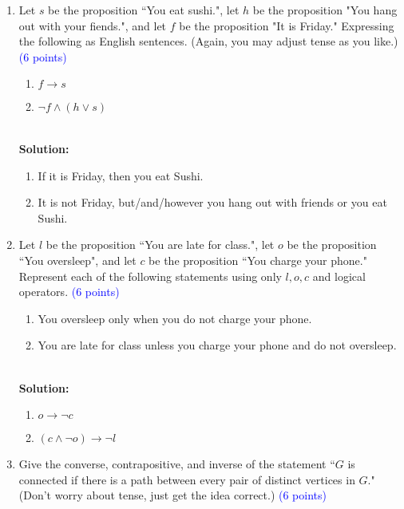 \documentclass{article}
\newcommand{\pt}[1]{\textcolor{blue}{(#1 points)}}
\newenvironment{solution}
{
\par
\color{blue}
\vspace{2mm}
\hline \\
\textbf{Solution:}
}
{
\vspace{2mm}
\newpage
}
\begin{document}
\begin{enumerate}
    \item Let $s$ be the proposition ``You eat sushi.", let $h$ be the proposition "You hang out with your fiends.", and let $f$ be the proposition "It is Friday." Expressing the following as English sentences. (Again, you may adjust tense as you like.) \pt 6
    \begin{enumerate}
        \item $f \rightarrow s$
        \item $\lnot f \wedge (h \lor s)$
    \end{enumerate}
    
    \begin{solution}
    \begin{enumerate}
        \item If it is Friday, then you eat Sushi.
        \item It is not Friday, but/and/however you hang out with friends or you eat Sushi.
    \end{enumerate}
    \end{solution}
    
    \item Let $l$ be the proposition ``You are late for class.", let $o$ be the proposition ``You oversleep", and let $c$ be the proposition ``You charge your phone." Represent each of the following statements using only $l, o, c$ and logical operators. \pt 6
    \begin{enumerate}
        \item You oversleep only when you do not charge your phone.
        \item You are late for class unless you charge your phone and do not oversleep.
    \end{enumerate}
    
    \begin{solution}
    \begin{enumerate}
        \item $o \rightarrow \neg c$
        \item $(c \land \neg o) \rightarrow \neg l$
    \end{enumerate}
    \end{solution}
    
    \item Give the converse, contrapositive, and inverse of the statement ``$G$ is connected if there is a path between every pair of distinct vertices in $G$." (Don't worry about tense, just get the idea correct.) \pt 6
    

\end{enumerate}
\end{document}
